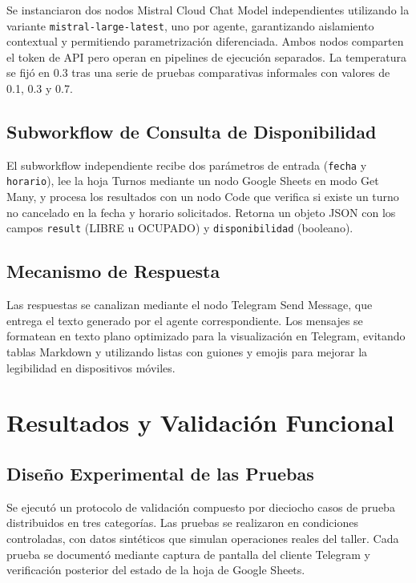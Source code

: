 \documentclass[12pt,a4paper]{report}
\begin{document}
Se instanciaron dos nodos Mistral Cloud Chat Model independientes utilizando la variante \texttt{mistral-large-latest}, uno por agente, garantizando aislamiento contextual y permitiendo parametrización diferenciada. Ambos nodos comparten el token de API pero operan en pipelines de ejecución separados. La temperatura se fijó en 0.3 tras una serie de pruebas comparativas informales con valores de 0.1, 0.3 y 0.7.

\section{Subworkflow de Consulta de Disponibilidad}

El subworkflow independiente recibe dos parámetros de entrada (\texttt{fecha} y \texttt{horario}), lee la hoja Turnos mediante un nodo Google Sheets en modo Get Many, y procesa los resultados con un nodo Code que verifica si existe un turno no cancelado en la fecha y horario solicitados. Retorna un objeto JSON con los campos \texttt{result} (LIBRE u OCUPADO) y \texttt{disponibilidad} (booleano).

\section{Mecanismo de Respuesta}

Las respuestas se canalizan mediante el nodo Telegram Send Message, que entrega el texto generado por el agente correspondiente. Los mensajes se formatean en texto plano optimizado para la visualización en Telegram, evitando tablas Markdown y utilizando listas con guiones y emojis para mejorar la legibilidad en dispositivos móviles.

\chapter{Resultados y Validación Funcional}
\label{cap:resultados}

\section{Diseño Experimental de las Pruebas}

Se ejecutó un protocolo de validación compuesto por dieciocho casos de prueba distribuidos en tres categorías. Las pruebas se realizaron en condiciones controladas, con datos sintéticos que simulan operaciones reales del taller. Cada prueba se documentó mediante captura de pantalla del cliente Telegram y verificación posterior del estado de la hoja de Google Sheets.
\end{document}
